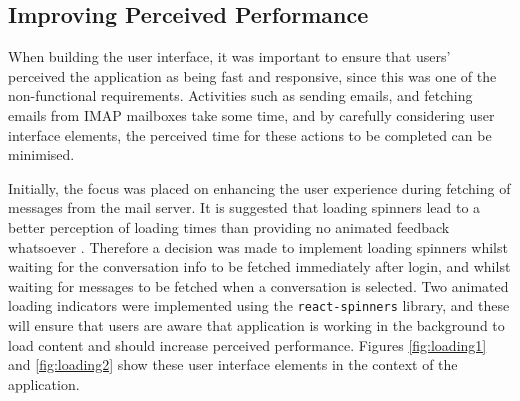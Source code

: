 \subsection{Improving Perceived Performance} %
When building the user interface, it was important to ensure that users' perceived the application as being fast and responsive, since this was one of the non-functional requirements. Activities such as sending emails, and fetching emails from IMAP mailboxes take some time, and by carefully considering user interface elements, the perceived time for these actions to be completed can be minimised.

Initially, the focus was placed on enhancing the user experience during fetching of messages from the mail server. It is suggested that loading spinners lead to a better perception of loading times than providing no animated feedback whatsoever \cite{persson2019improving}. Therefore a decision was made to implement loading spinners whilst waiting for the conversation info to be fetched immediately after login, and whilst waiting for messages to be fetched when a conversation is selected. Two animated loading indicators were implemented using the \verb|react-spinners| library, and these will ensure that users are aware that application is working in the background to load content and should increase perceived performance. Figures \ref{fig:loading1} and \ref{fig:loading2} show these user interface elements in the context of the application.

